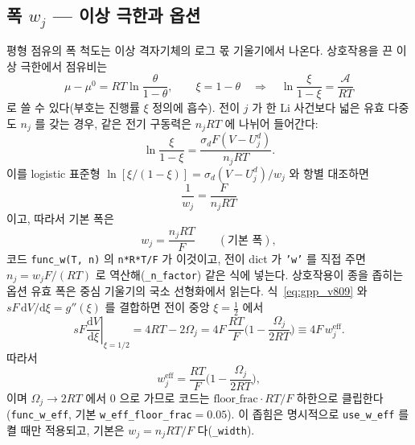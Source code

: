 \documentclass[11pt,a4paper]{article}
\newcommand{\dd}{\mathrm{d}}
\newcommand{\eff}{\mathrm{eff}}
\newcommand{\code}[1]{\texttt{#1}}
\begin{document}
\subsection{폭 $w_j$ — 이상 극한과 옵션}
평형 점유의 폭 척도는 이상 격자기체의 로그 몫 기울기에서 나온다. 상호작용을 끈 이상 극한에서 점유비는
\begin{equation}
\mu-\mu^0=RT\ln\frac{\theta}{1-\theta},
\qquad \xi=1-\theta
\quad\Longrightarrow\quad
\ln\frac{\xi}{1-\xi}=\frac{\mathcal A}{RT}
\label{eq:w_depart}
\end{equation}
로 쓸 수 있다(부호는 진행률 $\xi$ 정의에 흡수). 전이 $j$ 가 한 Li 사건보다 넓은 유효 다중도 $n_j$ 를 갖는 경우, 같은 전기 구동력은 $n_jRT$ 에 나뉘어 들어간다:
\begin{equation}
\ln\frac{\xi}{1-\xi}
=\frac{\sigma_dF(V-U_j^d)}{n_jRT}.
\label{eq:w_mult}
\end{equation}
이를 logistic 표준형 $\ln[\xi/(1-\xi)]=\sigma_d(V-U_j^d)/w_j$ 와 항별 대조하면
\begin{equation}
\frac{1}{w_j}=\frac{F}{n_jRT}
\label{eq:w_compare}
\end{equation}
이고, 따라서 기본 폭은
\begin{equation}
w_j=\frac{n_jRT}{F}\qquad(\text{기본 폭}),
\label{eq:wbase}
\end{equation}
코드 \code{func\_w(T, n)} 의 \code{n*R*T/F}
가 이것이고, 전이 dict 가 \code{'w'} 를 직접 주면 $n_j=w_jF/(RT)$ 로 역산해(\code{\_n\_factor}) 같은 식에 넣는다.
상호작용이 종을 좁히는 옵션 유효 폭은 중심 기울기의 국소 선형화에서 읽는다. 식~\eqref{eq:gpp_v809} 와
$sF\,\dd V/\dd\xi=g''(\xi)$ 를 결합하면 전이 중앙 $\xi=\tfrac12$ 에서
\begin{equation}
sF\left.\frac{\dd V}{\dd\xi}\right|_{\xi=1/2}
=4RT-2\Omega_j
=4F\,\frac{RT}{F}\Big(1-\frac{\Omega_j}{2RT}\Big)
\equiv 4F\,w_j^\eff .
\label{eq:weff_midpoint}
\end{equation}
따라서
\begin{equation}
w_j^\eff=\frac{RT}{F}\Big(1-\frac{\Omega_j}{2RT}\Big),
\label{eq:weff}
\end{equation}
이며 $\Omega_j\to2RT$ 에서 $0$ 으로 가므로 코드는 $\mathrm{floor\_frac}\cdot RT/F$ 하한으로 클립한다(\code{func\_w\_eff},
기본 \code{w\_eff\_floor\_frac}$=0.05$). 이 좁힘은 명시적으로 \code{use\_w\_eff} 를 켤 때만 적용되고, 기본은
$w_j=n_jRT/F$ 다(\code{\_width}).
\end{document}
